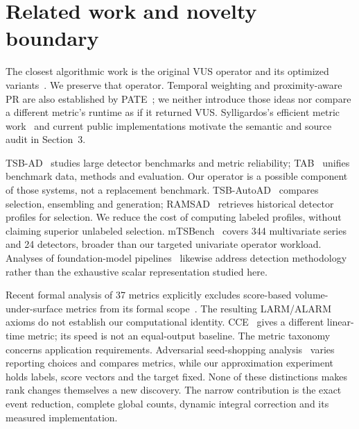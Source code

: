 \section{Related work and novelty boundary}
The closest algorithmic work is the original VUS operator and its optimized
variants~\cite{paparrizos2022,boniol2025}. We preserve that operator. Temporal
weighting and proximity-aware PR are also established by
PATE~\cite{ghorbani2024pateproximityawaretimeseries}; we neither introduce those
ideas nor compare a different metric's runtime as if it returned VUS.
Sylligardos's efficient metric work~\cite{sylligardos2025} and current public
implementations motivate the semantic and source audit in Section~3.

TSB-AD~\cite{tsbad} studies large detector benchmarks and metric reliability;
TAB~\cite{qiu2025tabunifiedbenchmarkingtime} unifies benchmark data, methods and
evaluation. Our operator is a possible component of those systems, not a
replacement benchmark. TSB-AutoAD~\cite{liu2025autoad} compares selection,
ensembling and generation; RAMSAD~\cite{panourgias2026retrievaltrainingsimilaritysearchbased}
retrieves historical detector profiles for selection. We reduce the cost of
computing labeled profiles, without claiming superior unlabeled selection.
mTSBench~\cite{mtsbench} covers 344 multivariate series and 24 detectors, broader
than our targeted univariate operator workload. Analyses of foundation-model
pipelines~\cite{zhu2026} likewise address detection methodology rather than the
exhaustive scalar representation studied here.

Recent formal analysis of 37 metrics explicitly excludes score-based
volume-under-surface metrics from its formal scope~\cite{wagner2025formallyexploringtimeseriesanomaly}.
The resulting LARM/ALARM axioms do not establish our computational identity.
CCE~\cite{zhong2025cceconfidenceconsistencyevaluationtime} gives a different
linear-time metric; its speed is not an equal-output baseline. The metric
taxonomy~\cite{yang2026problemorientedtaxonomyevaluationmetrics} concerns
application requirements. Adversarial seed-shopping
analysis~\cite{lyu2026didactuallyfixit} varies reporting choices and compares
metrics, while our approximation experiment holds labels, score vectors and
the target fixed. None of these distinctions makes rank changes themselves a
new discovery. The narrow contribution is the exact event reduction, complete
global counts, dynamic integral correction and its measured implementation.


